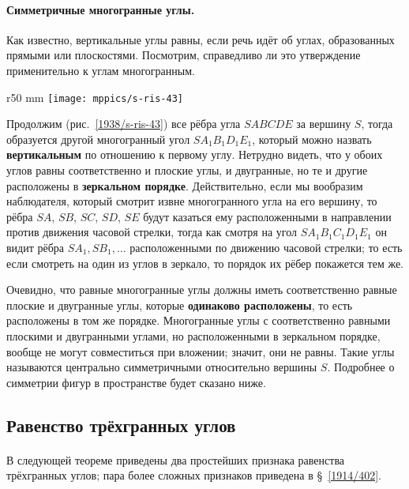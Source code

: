 \paragraph{Симметричные многогранные углы.}\label{1938/s53}
Как известно, вертикальные углы равны, если речь идёт об углах, образованных прямыми или плоскостями.
Посмотрим, справедливо ли это утверждение применительно к углам многогранным.

\begin{wrapfigure}[15]{r}{50 mm}
\vskip-0mm
\centering
\texttt{[image: mppics/s-ris-43]}
\caption{}\label{1938/s-ris-43}
\end{wrapfigure}

Продолжим (рис.~\ref{1938/s-ris-43}) все рёбра угла $SABCDE$ за вершину $S$, тогда образуется другой многогранный угол $SA_1B_1D_1E_1$, который можно назвать \textbf{вертикальным} по отношению к первому углу.
Нетрудно видеть, что у обоих углов равны соответственно и плоские углы, и двугранные, но те и другие расположены в \textbf{зеркальном порядке}.
Действительно, если мы вообразим наблюдателя, который смотрит извне многогранного угла на его вершину, то рёбра $SA$, $SB$, $SC$, $SD$, $SE$ будут казаться ему расположенными в направлении против движения часовой стрелки, тогда как смотря на угол $SA_1B_1C_1D_1E_1$ он видит рёбра $SA_1, SB_1,\dots$ расположенными по движению часовой стрелки;
то есть если смотреть на один из углов в зеркало, то порядок их рёбер покажется тем же.

Очевидно, что равные многогранные углы должны иметь соответственно равные плоские и двугранные углы, которые \textbf{одинаково расположены}, то есть расположены в том же порядке.
Многогранные углы с соответственно равными плоскими и двугранными углами, но расположенными в зеркальном порядке, вообще не могут совместиться при вложении;
значит, они не равны.
Такие углы называются центрально симметричными относительно вершины $S$.
Подробнее о симметрии фигур в пространстве будет сказано ниже.


\subsection*{Равенство трёхгранных углов}

\paragraph{}\label{1938/s52} В следующей теореме приведены два простейших признака равенства трёхгранных углов; пара более сложных признаков приведена в §~\ref{1914/402}.

